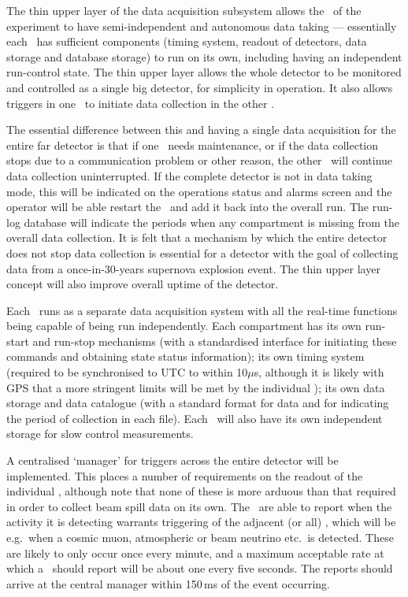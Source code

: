 The thin upper layer of the data acquisition subsystem allows the
\COMPARTMENTS\ of the experiment to have semi-independent and
autonomous data taking --- essentially each \COMPARTMENT\ has sufficient
components (timing system, readout of detectors, data storage and
database storage) to run on its own, including having an independent
run-control state.  The thin upper layer allows the whole detector to
be monitored and controlled as a single big detector, for simplicity
in operation.  It also allows triggers in one \COMPARTMENT\ to initiate
data collection in the other \COMPARTMENTS.

The essential difference between this and having a single data
acquisition for the entire far detector is that if one \COMPARTMENT\
needs maintenance, or if the data collection stops due to a
communication problem or other reason, the other \COMPARTMENTS\ will
continue data collection uninterrupted.  If the complete detector is
not in data taking mode, this will be indicated on the operations
status and alarms screen and the operator will be able restart the
\COMPARTMENT\ and add it back into the overall run.  The run-log
database will indicate the periods when any compartment is missing
from the overall data collection.  It is felt that a mechanism by
which the entire detector does not stop data collection is essential
for a detector with the goal of collecting data from a
once-in-30-years supernova explosion event.  The thin upper layer
concept will also improve overall uptime of the detector.

Each \COMPARTMENT\ runs as a separate data acquisition system with all
the real-time functions being capable of being run independently.
Each compartment has its own run-start and run-stop mechanisms (with a
standardised interface for initiating these commands and obtaining
state status information); its own timing system (required to be
synchronised to UTC to within 10$\mu$s, although it is likely with GPS
that a more stringent limits will be met by the individual
\COMPARTMENTS); its own data storage and data catalogue (with
a standard format for data and for indicating the period of collection
in each file).   Each \COMPARTMENT\ will also have its own independent
storage for slow control measurements.

A centralised `manager' for triggers across the entire detector will
be implemented.  This places a number of requirements on the readout
of the individual \COMPARTMENTS, although note that none of these is
more arduous than that required in order to collect beam spill data on
its own.  The \COMPARTMENTS\ are able to report when the activity it is
detecting warrants triggering of the adjacent (or all) \COMPARTMENTS,
which will be e.g.\ when a cosmic muon, atmospheric or beam neutrino
etc.\ is detected.  These are likely to only occur once every minute,
and a maximum acceptable rate at which a \COMPARTMENT\ should report
will be about one every five seconds.  The reports should arrive at
the central manager within 150\,ms of the event occurring.

